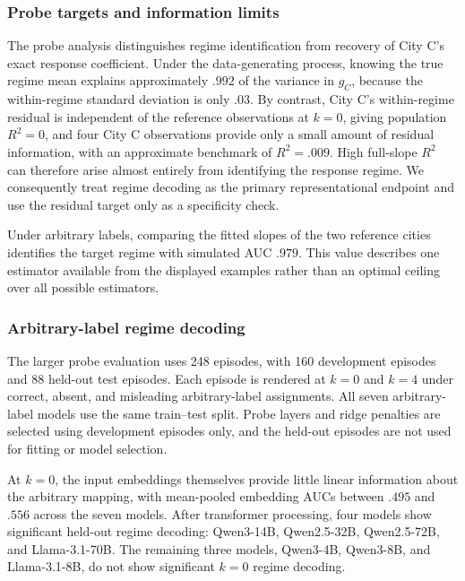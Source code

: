 \subsubsection{Probe targets and information limits}
\label{app:coin-city-probe-ceilings}

The probe analysis distinguishes regime identification from recovery of City C's exact response coefficient.
Under the data-generating process, knowing the true regime mean explains approximately $.992$ of the variance in \(g_C\), because the within-regime standard deviation is only $.03$.
By contrast, City C's within-regime residual is independent of the reference observations at \(k=0\), giving population \(R^2=0\), and four City C observations provide only a small amount of residual information, with an approximate benchmark of \(R^2=.009\).
High full-slope \(R^2\) can therefore arise almost entirely from identifying the response regime.
We consequently treat regime decoding as the primary representational endpoint and use the residual target only as a specificity check.

Under arbitrary labels, comparing the fitted slopes of the two reference cities identifies the target regime with simulated AUC $.979$.
This value describes one estimator available from the displayed examples rather than an optimal ceiling over all possible estimators.

\subsubsection{Arbitrary-label regime decoding}
\label{app:coin-city-probe-power}

The larger probe evaluation uses 248 episodes, with 160 development episodes and 88 held-out test episodes.
Each episode is rendered at \(k=0\) and \(k=4\) under correct, absent, and misleading arbitrary-label assignments.
All seven arbitrary-label models use the same train--test split.
Probe layers and ridge penalties are selected using development episodes only, and the held-out episodes are not used for fitting or model selection.

At \(k=0\), the input embeddings themselves provide little linear information about the arbitrary mapping, with mean-pooled embedding AUCs between $.495$ and $.556$ across the seven models.
After transformer processing, four models show significant held-out regime decoding: Qwen3-14B, Qwen2.5-32B, Qwen2.5-72B, and Llama-3.1-70B.
The remaining three models, Qwen3-4B, Qwen3-8B, and Llama-3.1-8B, do not show significant \(k=0\) regime decoding.

